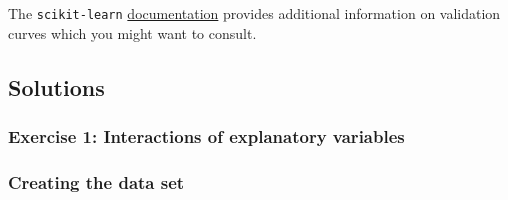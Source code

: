 \documentclass{scrartcl}
\begin{document}
The \texttt{scikit-learn}
\href{https://scikit-learn.org/stable/modules/learning_curve.html}{documentation}
provides additional information on validation curves which you might
want to consult.


\hypertarget{solutions}{%
\subsection{Solutions}\label{solutions}}

    \hypertarget{exercise-1-interactions-of-explanatory-variables}{%
\subsubsection*{Exercise 1: Interactions of explanatory
variables}\label{exercise-1-interactions-of-explanatory-variables}}

    \hypertarget{creating-the-data-set}{%
\subsubsection*{Creating the data set}\label{creating-the-data-set}}
\end{document}
